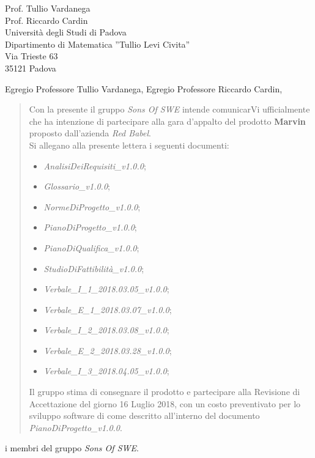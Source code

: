 \documentclass{letter}
\newcommand{\gruppo}{\emph{Sons Of SWE}}
\newcommand{\AdR}{\emph{AnalisiDeiRequisiti\_v1.0.0}}
\newcommand{\SdF}{\emph{StudioDiFattibilità\_v1.0.0}}
\newcommand{\NdP}{\emph{NormeDiProgetto\_v1.0.0}}
\newcommand{\PdP}{\emph{PianoDiProgetto\_v1.0.0}}
\newcommand{\PdQ}{\emph{PianoDiQualifica\_v1.0.0}}
\newcommand{\G}{\emph{Glossario\_v1.0.0}}
\newcommand{\VIuno}{\emph{Verbale\_I\_1\_2018.03.05\_v1.0.0}}
\newcommand{\VEuno}{\emph{Verbale\_E\_1\_2018.03.07\_v1.0.0}}
\newcommand{\VIdue}{\emph{Verbale\_I\_2\_2018.03.08\_v1.0.0}}
\newcommand{\VEdue}{\emph{Verbale\_E\_2\_2018.03.28\_v1.0.0}}
\newcommand{\VItre}{\emph{Verbale\_I\_3\_2018.04.05\_v1.0.0}}
\begin{document}
	
\begin{letter} {   
	\hfill Prof. Tullio Vardanega\\
	\hfill Prof. Riccardo Cardin\\
	\hfill Università degli Studi di Padova \\
	\hfill Dipartimento di Matematica ''Tullio Levi Civita'' \\
	\hfill Via Trieste 63 \\
	\hfill 35121 Padova \\
}

\date{}
\opening{Egregio Professore Tullio Vardanega, \newline Egregio Professore Riccardo Cardin,}
	\begin{quotation}
		\noindent Con la presente il gruppo \textit{\gruppo} intende comunicarVi ufficialmente che ha intenzione di partecipare alla gara d'appalto del prodotto \textbf{Marvin} proposto dall'azienda \textit{Red Babel}.\\
		Si allegano alla presente lettera i seguenti documenti:
		\begin{itemize}
			\item \AdR{};
			\item \G{};
			\item \NdP{};
			\item \PdP{};
			\item \PdQ{};
			\item \SdF{};
			\item \VIuno{};
			\item \VEuno{};
			\item \VIdue{};
			\item \VEdue{};
			\item \VItre{};
		\end{itemize}
		Il gruppo stima di consegnare il prodotto e partecipare alla Revisione di Accettazione del giorno 16 Luglio 2018, con un costo preventivato per lo sviluppo software di  come descritto all’interno del documento \PdP{}.
	\end{quotation}
{
	\setlength\parindent{24pt}
	\indent i membri del gruppo \gruppo.
}
\end{letter}
\end{document}
